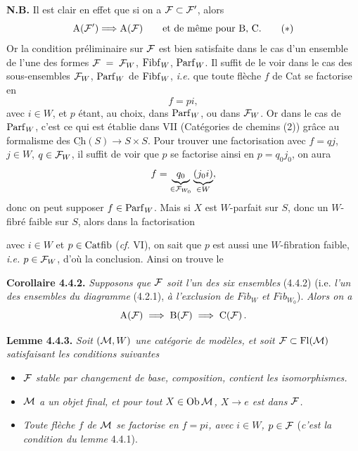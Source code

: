 \textbf{N.B.} Il est clair en effet que si on a $\mathcal{F} \subset \mathcal{F}'$, alors
\[
\mathrm{A}(\mathcal{F}') \Longrightarrow \mathrm{A}(\mathcal{F}) \qquad \text{et de même pour B, C.}
\tag*{$(*)$}
\]
Or la condition préliminaire sur $\mathcal{F}$ est bien satisfaite dans le cas d'un ensemble de l'une des formes $\mathcal{F} \;=\; \mathcal{F}_W$, $\mathrm{Fibf}_W$, $\mathrm{Parf}_W$. Il suffit de le voir dans le cas des sous-ensembles $\mathcal{F}_W$, $\mathrm{Parf}_W$ de $\mathrm{Fibf}_W$, \textit{i.e.} que toute flèche $f$ de Cat se factorise en
\[
f = pi,
\]
avec $i \in W$, et $p$ étant, au choix, dans $\mathrm{Parf}_W$, ou dans $\mathcal{F}_W$. Or dans le cas de $\mathrm{Parf}_W$, \marginpar{$\|$}c'est ce qui est établie dans VII (Catégories de chemins (2)) grâce au formalisme des $\underline{\mathrm{Ch}}(S) \longrightarrow S \times S$. Pour trouver une factorisation avec $f = qj$, $j \in W$, $q \in \mathcal{F}_W$, il suffit de voir que $p$ se factorise ainsi en $p = q_0 j_0$, on aura %
\[
f = \underbrace{q_0}_{\in \mathcal{F}_{W_0}} \underbrace{(j_0 i)}_{\in W},
\]
donc on peut supposer $f \in \mathrm{Parf}_W$. Mais si $X$ est $W$-parfait sur $S$, donc un
$W$-fibré faible sur $S$, alors dans la factorisation
\begin{center}
\end{center}
avec $i \in W$ et $p \in \mathrm{Catfib}$ (\textit{cf.} VI), on sait que $p$ est aussi une $W$-fibration faible, \textit{i.e.} $p \in \mathcal{F}_W$, d'où la conclusion. Ainsi on trouve le

\textbf{Corollaire 4.4.2.} \textit{Supposons que $\mathcal{F}$ soit l'un des six ensembles} (4.4.2) (i.e. \textit{l'un des ensembles du diagramme} (4.2.1), \textit{à l'exclusion de $\mathit{Fib}_W$ et $\mathit{Fib}_{W_0}$}). \textit{Alors on a}
\[
\mathrm{A}(\mathcal{F}) \;\Longrightarrow\; \mathrm{B}(\mathcal{F}) \;\Longrightarrow\; \mathrm{C}(\mathcal{F})\,.
\]

\textbf{Lemme 4.4.3.} \textit{Soit $(\mathcal{M}, W)$ une catégorie de modèles, et soit $\mathcal{F} \subset \operatorname{Fl}(\mathcal{M})$ satisfaisant les conditions suivantes}
\begin{itemize}[leftmargin=3em]
\item[1)] \textit{$\mathcal{F}$ stable par changement de base, composition, contient les isomorphismes.}
\item[2)] \textit{$\mathcal{M}$ a un objet final, et pour tout $X \in \mathrm{Ob}\,\mathcal{M}$, $X \longrightarrow e$ est dans $\mathcal{F}$.}
\item[3)] \textit{Toute flèche $f$ de $\mathcal{M}$ se factorise en $f = pi$, avec $i \in W$, $p \in \mathcal{F}$} (\textit{c'est la condition du lemme} 4.4.1).
\end{itemize}

